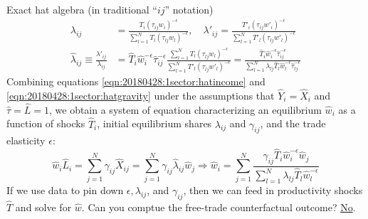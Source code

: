 \documentclass[10pt,notes=hide]{beamer}
\begin{document}
\begin{frame}{Exact hat algebra (in traditional ``$ij$'' notation)}
\begin{align}
\lambda_{ij} 
&=
\frac{T_{i} \left(\tau_{ij}w_i\right)^{-\epsilon}}{\sum_{l=1}^{N} T_{l}  \left(\tau_{lj}w_l\right)^{-\epsilon}},
\quad
\lambda'_{ij} 
=
\frac{T'_{i} \left(\tau_{ij}w'_i\right)^{-\epsilon}}{\sum_{l=1}^{N} T'_{l}  \left(\tau_{lj}w'_l\right)^{-\epsilon}}
\nonumber \\
\hat{\lambda}_{ij}
\equiv 
\frac{\lambda'_{ij}}{\lambda_{ij}}
&=
\hat{T}_{i} \hat{w}_{i}^{-\epsilon} \hat{\tau}_{ij}^{-\epsilon}
\frac{\sum_{l=1}^{N} T_{l}  \left(\tau_{lj}w_l \right)^{-\epsilon}}
	 {\sum_{l=1}^{N} T'_{l} \left(\tau_{lj}w'_l\right)^{-\epsilon}}
=
\frac{\hat{T}_{i} \hat{w}_{i}^{-\epsilon}\hat{\tau}_{ij}^{-\epsilon}}{\sum_{l=1}^{N} \lambda_{lj} \hat{T}_{l} \hat{w}_l^{-\epsilon} \hat{\tau}_{lj}^{-\epsilon}}
\label{eqn:20180428:1sector:hatgravity}
\end{align}
Combining equations \eqref{eqn:20180428:1sector:hatincome} and \eqref{eqn:20180428:1sector:hatgravity}
under the assumptions that $\hat{Y}_{i}=\hat{X}_{i}$ and $\hat{\tau}=\hat{L}=1$, we
obtain a system of equation characterizing an equilibrium $\hat{w}_i$ as a
function of shocks $\hat{T}_i$, initial equilibrium shares $\lambda_{ij}$ and
$\gamma_{ij}$, and the trade elasticity $\epsilon$:
\begin{equation}
\hat{w}_i \hat{L}_i
= 
\sum_{j=1}^{N} \gamma_{ij} \hat{X}_{ij}
=
\sum_{j=1}^{N} \gamma_{ij} \hat{\lambda}_{ij} \hat{w}_{j}
\nonumber 
\Rightarrow
\hat{w}_i
= 
\sum_{j=1}^{N}
\frac{\gamma_{ij} \hat{T}_{i} \hat{w}_{i}^{-\epsilon} \hat{w}_{j} }
{\sum_{l=1}^{N} \lambda_{lj} \hat{T}_{l} \hat{w}_l^{-\epsilon}}
\label{eqn:20180428:1sector:hatequilibriumequations}
\end{equation}
If we use data to pin down $\epsilon, \lambda_{ij}$, and $\gamma_{ij}$, then
we can feed in productivity shocks $\hat{T}$ and solve for $\hat{w}$.
Can you comptue the free-trade counterfactual outcome? \href{https://tradediversion.net/2020/10/04/thought-experiments-that-exact-hat-algebra-can-and-cannot-compute/}{No}.
\end{frame}
\end{document}
